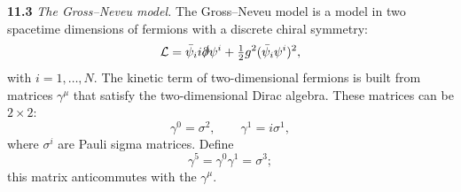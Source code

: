 \textbf{11.3} \emph{The Gross--Neveu model.}  The Gross--Neveu model is a
model in two spacetime dimensions of fermions with a discrete chiral
symmetry:
\begin{equation}
  \mathcal{L} = \bar{\psi}_i i\slashed{\partial}\psi^i
    + \tfrac{1}{2}g^2(\bar{\psi}_i\psi^i)^2 ,
\end{equation}
with $i = 1, \ldots, N$.  The kinetic term of two-dimensional fermions is
built from matrices $\gamma^\mu$ that satisfy the two-dimensional Dirac
algebra.  These matrices can be $2\times2$:
\begin{equation}
  \gamma^0 = \sigma^2,\qquad \gamma^1 = i\sigma^1 ,
\end{equation}
where $\sigma^i$ are Pauli sigma matrices.  Define
\begin{equation}
  \gamma^5 = \gamma^0\gamma^1 = \sigma^3 ;
\end{equation}
this matrix anticommutes with the $\gamma^\mu$.
